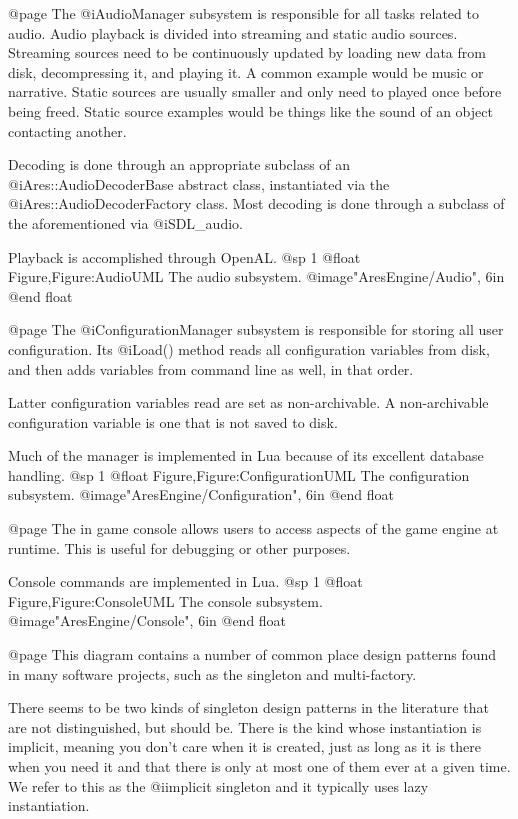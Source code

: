 @page
The @i{AudioManager} subsystem is responsible for all tasks related to audio. Audio playback is divided into streaming and static audio sources. Streaming sources need to be continuously updated by loading new data from disk, decompressing it, and playing it. A common example would be music or narrative. Static sources are usually smaller and only need to played once before being freed. Static source examples would be things like the sound of an object contacting another.

Decoding is done through an appropriate subclass of an @i{Ares::AudioDecoderBase} abstract class, instantiated via the @i{Ares::AudioDecoderFactory} class. Most decoding is done through a subclass of the aforementioned via @i{SDL_audio}.

Playback is accomplished through OpenAL.
@sp 1
@float Figure,Figure:AudioUML
The audio subsystem.
@image{"AresEngine/Audio", 6in}
@end float

@page
The @i{ConfigurationManager} subsystem is responsible for storing all user configuration. Its @i{Load()} method reads all configuration variables from disk, and then adds variables from command line as well, in that order. 

Latter configuration variables read are set as non-archivable. A non-archivable configuration variable is one that is not saved to disk.

Much of the manager is implemented in Lua because of its excellent database handling.
@sp 1
@float Figure,Figure:ConfigurationUML
The configuration subsystem.
@image{"AresEngine/Configuration", 6in}
@end float

@page
The in game console allows users to access aspects of the game engine at runtime. This is useful for debugging or other purposes.

Console commands are implemented in Lua.
@sp 1
@float Figure,Figure:ConsoleUML
The console subsystem.
@image{"AresEngine/Console", 6in}
@end float

@page
This diagram contains a number of common place design patterns found in many software projects, such as the singleton and multi-factory. 

There seems to be two kinds of singleton design patterns in the literature that are not distinguished, but should be. There is the kind whose instantiation is implicit, meaning you don't care when it is created, just as long as it is there when you need it and that there is only at most one of them ever at a given time. We refer to this as the @i{implicit singleton} and it typically uses lazy instantiation.

